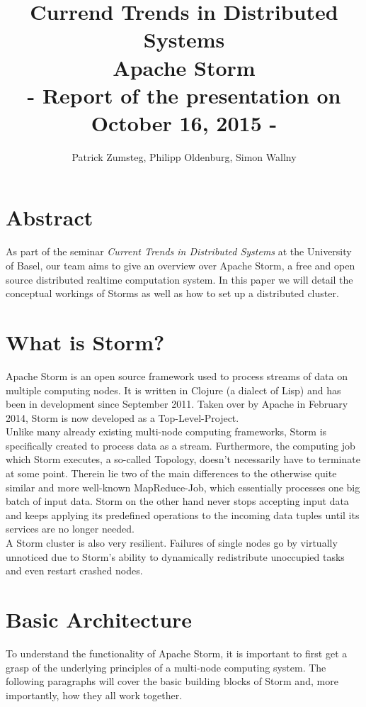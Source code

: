 \documentclass[12pt,a4paper]{article}
\title{Currend Trends in Distributed Systems\\\textbf{Apache Storm}\\\large{- Report of the presentation on October 16, 2015 -}}
\date{}
\author{Patrick Zumsteg, Philipp Oldenburg, Simon Wallny}
\begin{document}
\maketitle
\section{Abstract}
As part of the seminar \textit{Current Trends in Distributed Systems} at the University of Basel, our team aims to give an overview over Apache Storm, a free and open source distributed realtime computation system. In this paper we will detail the conceptual workings of Storms as well as how to set up a distributed cluster.
\tableofcontents
\section{What is Storm?}
\onehalfspacing
Apache Storm is an open source framework used to process streams of data on multiple computing nodes. It is written in Clojure (a dialect of Lisp) and has been in development since September 2011. Taken over by Apache in February 2014, Storm is now developed as a Top-Level-Project.\\

Unlike many already existing multi-node computing frameworks, Storm is specifically created to process data as a stream. Furthermore, the computing job which Storm executes, a so-called Topology, doesn't necessarily have to terminate at some point. Therein lie two of the main differences to the otherwise quite similar and more well-known MapReduce-Job, which essentially processes one big batch of input data. Storm on the other hand never stops accepting input data and keeps applying its predefined operations to the incoming data tuples until its services are no longer needed.\\

A Storm cluster is also very resilient. Failures of single nodes go by virtually unnoticed due to Storm's ability to dynamically redistribute unoccupied tasks and even restart crashed nodes.\\
\pagebreak

\section{Basic Architecture}

To understand the functionality of Apache Storm, it is important to first get a grasp of the underlying principles of a multi-node computing system. The following paragraphs will cover the basic building blocks of Storm and, more importantly, how they all work together.
\end{document}

